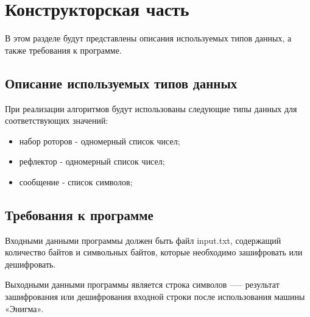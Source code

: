 \chapter{Конструкторская часть}
В этом разделе будут представлены описания используемых типов данных, а также требования к программе.

\section{Описание используемых типов данных}

При реализации алгоритмов будут использованы следующие типы данных для соответствующих значений:
\begin{itemize}[label=---]
	\item набор роторов  - одномерный список чисел;
	\item рефлектор - одномерный список чисел;
	\item сообщение - список символов;
\end{itemize}

\section{Требования к программе}
Входными данными программы должен быть файл input.txt, содержащий количество байтов и символьных байтов, которые необходимо зашифровать или дешифровать.

Выходными данными программы является строка символов —-- результат зашифрования или дешифрования входной строки после использования машины «Энигма».

